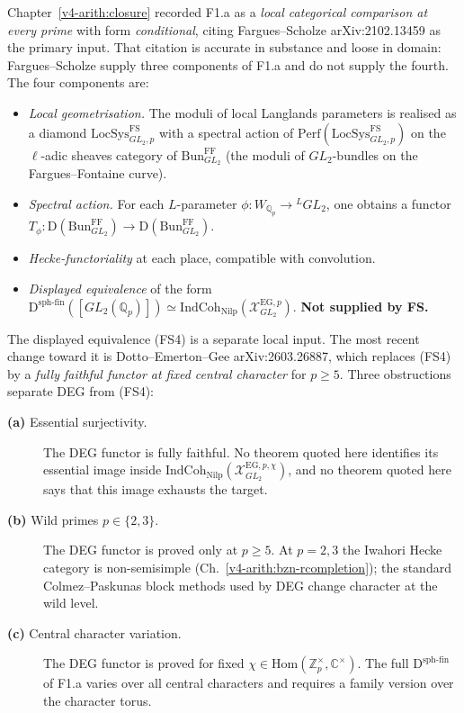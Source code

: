 Chapter~\ref{v4-arith:closure} recorded F1.a as a
\emph{local categorical comparison at every prime} with form
\emph{conditional}, citing Fargues--Scholze arXiv:2102.13459
as the primary input. That citation is accurate in substance and
loose in domain: Fargues--Scholze supply three components of F1.a
and do not supply the fourth. The four components are:
\begin{itemize}
\item[(FS1)] \emph{Local geometrisation.} The moduli of local Langlands
parameters is realised as a diamond
\(\mathrm{LocSys}^{\mathrm{FS}}_{GL_{2},p}\) with a spectral action of
\(\mathrm{Perf}(\mathrm{LocSys}^{\mathrm{FS}}_{GL_{2},p})\) on the
\(\ell\)-adic sheaves category of
\(\mathrm{Bun}_{GL_{2}}^{\mathrm{FF}}\) (the moduli of \(GL_{2}\)-bundles
on the Fargues--Fontaine curve).
\item[(FS2)] \emph{Spectral action.} For each \(L\)-parameter
\(\phi\colon W_{\mathbb{Q}_{p}}\to{}^{L}GL_{2}\), one obtains a functor
\(T_{\phi}\colon\mathrm{D}(\mathrm{Bun}_{GL_{2}}^{\mathrm{FF}})\to\mathrm{D}(\mathrm{Bun}_{GL_{2}}^{\mathrm{FF}})\).
\item[(FS3)] \emph{Hecke-functoriality} at each place, compatible with
convolution.
\item[(FS4)] \emph{Displayed equivalence} of the form
\(\mathrm{D}^{\mathrm{sph\text{-}fin}}([GL_{2}(\mathbb{Q}_{p})])\simeq\mathrm{IndCoh}_{\mathrm{Nilp}}(\mathcal{X}^{\mathrm{EG},p}_{GL_{2}})\).
\textbf{Not supplied by FS.}
\end{itemize}

The displayed equivalence (FS4) is a separate local input. The most
recent change toward it is Dotto--Emerton--Gee arXiv:2603.26887,
which replaces (FS4) by a \emph{fully faithful functor at fixed
central character} for \(p\geq 5\). Three obstructions separate DEG
from (FS4):

\begin{description}
\item[\textbf{(a)} Essential surjectivity.] The DEG functor is
fully faithful.  No theorem quoted here identifies its essential
image inside
\(\mathrm{IndCoh}_{\mathrm{Nilp}}(\mathcal{X}^{\mathrm{EG},p,\chi}_{GL_{2}})\),
and no theorem quoted here says that this image exhausts the target.
\item[\textbf{(b)} Wild primes \(p\in\{2,3\}\).] The DEG functor is
proved only at \(p\geq 5\). At \(p=2,3\) the Iwahori Hecke category is
non-semisimple (Ch.~\ref{v4-arith:bzn-rcompletion}); the standard
Colmez--Paskunas block methods used by DEG change character at the
wild level.
\item[\textbf{(c)} Central character variation.] The DEG functor is
proved for fixed \(\chi\in\mathrm{Hom}(\mathbb{Z}_{p}^{\times},\mathbb{C}^{\times})\).
The full \(\mathrm{D}^{\mathrm{sph\text{-}fin}}\) of F1.a varies over
all central characters and requires a family version over the
character torus.
\end{description}

